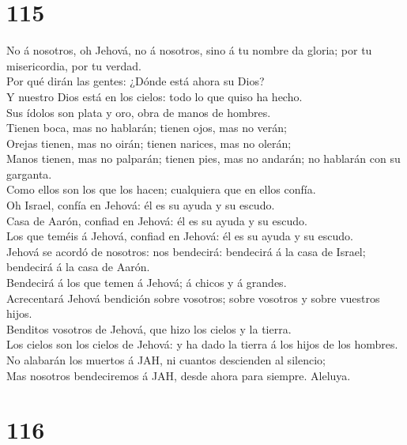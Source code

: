 \hypertarget{section-114}{%
\section{115}\label{section-114}}

 No á nosotros, oh Jehová, no á nosotros, sino á tu nombre
da gloria; por tu misericordia, por tu verdad.\\
 Por qué dirán las gentes: ¿Dónde está ahora su Dios?\\
 Y nuestro Dios está en los cielos: todo lo que quiso ha
hecho.\\
 Sus ídolos son plata y oro, obra de manos de hombres.\\
 Tienen boca, mas no hablarán; tienen ojos, mas no verán;\\
 Orejas tienen, mas no oirán; tienen narices, mas no
olerán;\\
 Manos tienen, mas no palparán; tienen pies, mas no andarán;
no hablarán con su garganta.\\
 Como ellos son los que los hacen; cualquiera que en ellos
confía.\\
 Oh Israel, confía en Jehová: él es su ayuda y su escudo.\\
 Casa de Aarón, confiad en Jehová: él es su ayuda y su
escudo.\\
 Los que teméis á Jehová, confiad en Jehová: él es su ayuda
y su escudo.\\
 Jehová se acordó de nosotros: nos bendecirá: bendecirá á
la casa de Israel; bendecirá á la casa de Aarón.\\
 Bendecirá á los que temen á Jehová; á chicos y á
grandes.\\
 Acrecentará Jehová bendición sobre vosotros; sobre
vosotros y sobre vuestros hijos.\\
 Benditos vosotros de Jehová, que hizo los cielos y la
tierra.\\
 Los cielos son los cielos de Jehová: y ha dado la tierra á
los hijos de los hombres.\\
 No alabarán los muertos á JAH, ni cuantos descienden al
silencio;\\
 Mas nosotros bendeciremos á JAH, desde ahora para siempre.
Aleluya.

\hypertarget{section-115}{%
\section{116}\label{section-115}}

